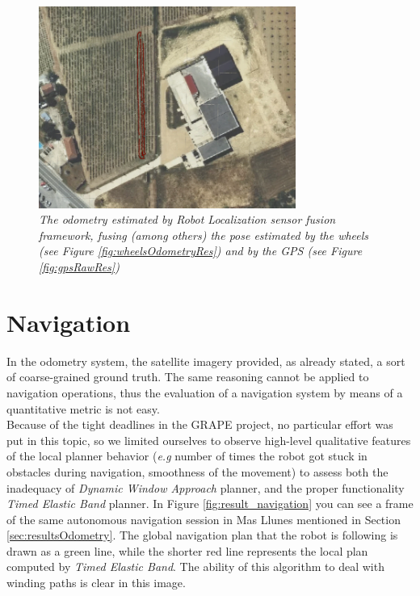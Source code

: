 \begin{figure}
	\centering
	\includegraphics[width=0.75\textwidth]{Images/experimental_data/rob_loc_result.png}
	\caption{\textit{The odometry estimated by Robot Localization sensor fusion framework, fusing (among others) the pose estimated by the wheels (see Figure \ref{fig:wheelsOdometryRes}) and by the GPS (see Figure \ref{fig:gpsRawRes})}}
	\label{fig:robLocResult}
\end{figure}

\section{Navigation}

In the odometry system, the satellite imagery provided, as already stated, a sort of coarse-grained ground truth. The same reasoning cannot be applied to navigation operations, thus the evaluation of a navigation system by means of a quantitative metric is not easy. \\
Because of the tight deadlines in the \ac{GRAPE} project, no particular effort was put in this topic, so we limited ourselves to observe high-level qualitative features of the local planner behavior (\textit{e.g} number of times the robot got stuck in obstacles during navigation, smoothness of the movement) to assess both the inadequacy of \textit{Dynamic Window Approach} planner, and the proper functionality \textit{Timed Elastic Band} planner.
In Figure \ref{fig:result_navigation} you can see a frame of the same autonomous navigation session in Mas Llunes mentioned in Section \ref{sec:resultsOdometry}. The global navigation plan that the robot is following is drawn as a green line, while the shorter red line represents the local plan computed by  \textit{Timed Elastic Band}. The ability of this algorithm to deal with winding paths is clear in this image.

